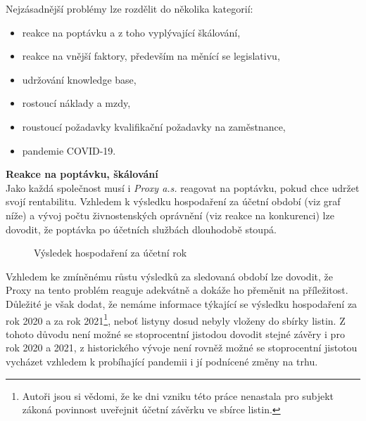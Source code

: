 Nejzásadnější problémy lze rozdělit do několika kategorií:\\

\begin{itemize}
	\item reakce na poptávku a z toho vyplývající škálování,
	\item reakce na vnější faktory, především na měnící se legislativu,
	\item udržování knowledge base,
	\item rostoucí náklady a mzdy,
	\item roustoucí požadavky kvalifikační požadavky na zaměstnance,
	\item pandemie COVID-19.
\end{itemize}

\vspace*{5mm}

\newpage

\textbf{Reakce na poptávku, škálování}\\

Jako každá společnost musí i \textit{Proxy a.s.} reagovat na poptávku, pokud chce udržet svojí rentabilitu. Vzhledem k výsledku hospodaření za účetní období (viz graf níže) a vývoj počtu živnostenských oprávnění (viz reakce na konkurenci) lze dovodit, že poptávka po účetních službách dlouhodobě stoupá.

\begin{figure}[!htbp]
	\caption[Výsledek hospodaření za účetní rok]{Výsledek hospodaření za účetní rok}
	\label{fig:Vysledek hospodareni}
\end{figure}

Vzhledem ke zmíněnému růstu výsledků za sledovaná období lze dovodit, že Proxy na tento problém reaguje adekvátně a dokáže ho přeměnit na příležitost.\\

Důležité je však dodat, že nemáme informace týkající se výsledku hospodaření za rok 2020 a za rok 2021\footnote{Autoři jsou si vědomi, že ke dni vzniku této práce nenastala pro subjekt zákoná povinnost uveřejnit účetní závěrku ve sbírce listin.}, neboť listyny dosud nebyly vloženy do sbírky listin. Z tohoto důvodu není možné se stoprocentní jistodou dovodit stejné závěry i pro rok 2020 a 2021, z historického vývoje není rovněž možné se stoprocentní jistotou vycházet vzhledem k probíhající pandemii i jí podnícené změny na trhu.\\

